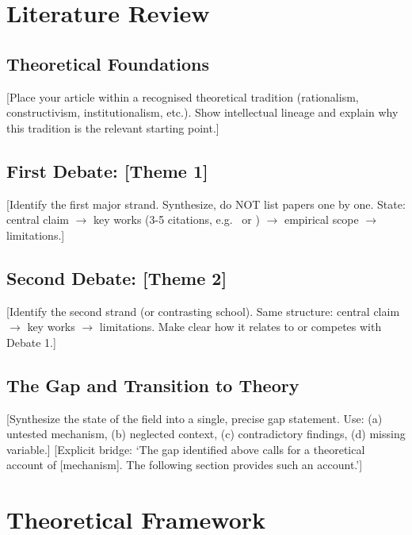 \section{Literature Review}\label{sec:lit} %

\subsection{Theoretical Foundations} %
[Place your article within a recognised theoretical tradition (rationalism, constructivism, institutionalism, etc.). Show intellectual lineage and explain why this tradition is the relevant starting point.]

\subsection{First Debate: [Theme 1]} %
[Identify the first major strand. Synthesize, do NOT list papers one by one. State: central claim $\rightarrow$ key works (3-5 citations, e.g.\ \citet{author2020} or \citep{author2020}) $\rightarrow$ empirical scope $\rightarrow$ limitations.]

\subsection{Second Debate: [Theme 2]} %
[Identify the second strand (or contrasting school). Same structure: central claim $\rightarrow$ key works $\rightarrow$ limitations. Make clear how it relates to or competes with Debate 1.]

\subsection{The Gap and Transition to Theory} %
[Synthesize the state of the field into a single, precise gap statement. Use: (a) untested mechanism, (b) neglected context, (c) contradictory findings, (d) missing variable.]
[Explicit bridge: `The gap identified above calls for a theoretical account of [mechanism]. The following section provides such an account.']

\section{Theoretical Framework}\label{sec:theory} %

